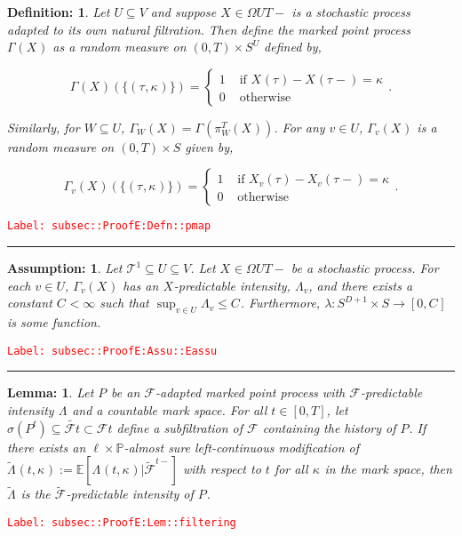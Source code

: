 \documentclass[12pt]{article}
\newcommand{\mb}{\mathbb}
\newcommand{\mc}{\mathcal}
\newcommand{\ra}{\rightarrow}
\newcommand{\te}{\text}
\newcommand{\tr}{\textcolor{red}}
\newcommand{\labe}[1]{\tr{\texttt{Label: #1}}}
\newcommand{\lin}{\rule{\linewidth}{0.4 pt}}
\newcommand{\pr}{\mb{P}}							%
\newcommand{\ex}[1]{\mb{E}\left[#1\right]}			%
\renewcommand{\v}{v}							%
\renewcommand{\U}{U}							%
\newcommand{\UU}{W}								%
\renewcommand{\S}{S}							%
\newcommand{\T}{T}								%
\renewcommand{\t}{t}							%
\newcommand{\F}{\mc{F}}							%
\newcommand{\degr}{D}								%
\newcommand{\pup}[1]{^{#1}}							%
\newcommand{\tree}{\mc{T}}							%
\newcommand{\V}{V}									%
\newcommand{\rt}[1]{\tau^{#1}}						%
\newcommand{\piV}[2]{\pi_{#1}^{#2}}					%
\newcommand{\rxvt}[2]{X_{#1}{(#2)}}					%
\newcommand{\rxvts}[2]{X_{#1}{#2}}					%
\newcommand{\rp}[1]{P^{#1}}							%
\newcommand{\ratee}[1]{\Lambda_{#1}}				%
\newcommand{\cratee}[2]{\alt{\Lambda}_{#1}^{#2}} 	%
\newcommand{\const}[1]{C_{#1}}						%
\newcommand{\Sm}{\ell}								%
\newcommand{\alt}{\widetilde}						%
\renewcommand{\mark}[1]{\kappa^{#1}}				%
\newcommand{\pmap}[1]{\Gamma_{#1}}				%
\newtheorem{lem}[thms]{Lemma: }
\newtheorem{defn}[thms]{Definition: }
\newtheorem{assu}[thms]{Assumption: }
\begin{document}
\begin{defn}
Let \(\U\subseteq \V\) and suppose \(\rxvts{}{} \in \Omega{\U}{\T-}\) is a stochastic process adapted to its own natural filtration. Then define the marked point process \(\pmap{}(\rxvts{}{})\) as a random measure on \((0,\T) \times \S^\U\) defined by,

\[\pmap{}(\rxvts{}{})(\{(\rt{},\mark{})\}) = \begin{cases}
1 &\te{ if } \rxvt{}{\rt{}} - \rxvt{}{\rt{}-} = \mark{}\\
0 &\te{ otherwise}
\end{cases}.\]

Similarly, for \(\UU \subseteq \U\), \(\pmap{\UU}(\rxvts{}{}) = \pmap{}\left(\piV{\UU}{\T}(\rxvts{}{})\right)\). For any \(\v\in \U\), \(\pmap{\v}(\rxvts{}{})\) is a random measure on \((0,\T) \times \S\) given by,

\[\pmap{\v}(\rxvts{}{})(\{(\rt{},\mark{})\}) = \begin{cases}
1 &\te{ if } \rxvt{\v}{\rt{}} - \rxvt{\v}{\rt{}-} = \mark{}\\
0 &\te{ otherwise}
\end{cases}.\]
\label{subsec::ProofE:Defn::pmap}
\end{defn}
\labe{subsec::ProofE:Defn::pmap}

\lin

\begin{assu}
Let \(\tree\pup{1}\subseteq\U \subseteq \V\). Let \(\rxvts{}{}\in \Omega{\U}{\T-}\) be a stochastic process. For each \(\v\in \U\), \(\pmap{\v}(\rxvts{}{})\) has an \(\rxvts{}{}\)-predictable intensity, \(\ratee{\v}\), and there exists a constant \(\const{} < \infty\) such that \(\sup_{\v\in\U} \ratee{\v} \leq \const{}\). Furthermore, \(\lambda: \S^{\degr+1}\times \S\ra[0,\const{}]\) is some function.
\label{subsec::ProofE:Assu::Eassu}
\end{assu}
\labe{subsec::ProofE:Assu::Eassu}

\lin

\begin{lem}
Let \(\rp{}\) be an \(\F{}{}\)-adapted marked point process with \(\F{}{}\)-predictable intensity \(\ratee{}\) and a countable mark space. For all \(\t \in [0,\T]\), let \(\sigma(\rp{\t}) \subseteq \alt{\F{}{\t}}\subset \F{}{\t}\) define a subfiltration of \(\F{}{}\) containing the history of \(\rp{}\). If there exists an \(\Sm\times \pr\)-almost sure left-continuous modification of \(\cratee{}{}(\t,\mark{}) := \ex{\ratee{}(\t,\mark{})|\alt{\F{}{}}^{\t-}}\) with respect to \(\t\) for all \(\mark{}\) in the mark space, then \(\cratee{}{}\) is the \(\alt{\F{}{}}\)-predictable intensity of \(\rp{}\).
\label{subsec::ProofE:Lem::filtering}
\end{lem}
\labe{subsec::ProofE:Lem::filtering}
\end{document}

